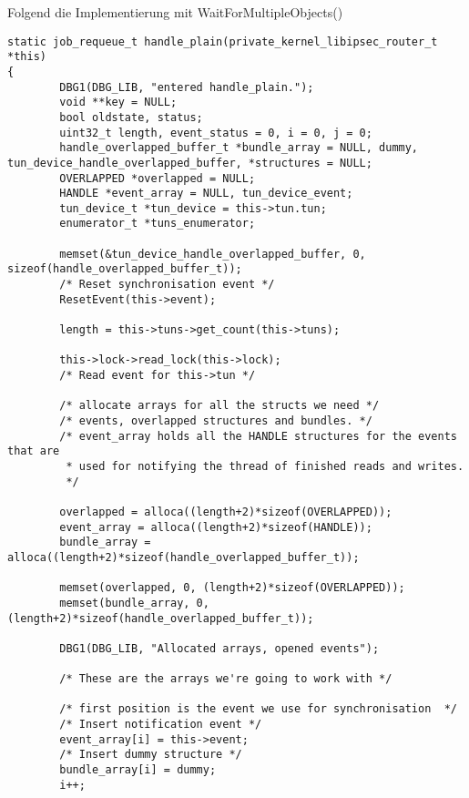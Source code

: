 Folgend die Implementierung mit WaitForMultipleObjects()
\begin{lstlisting}[caption=Code für handle\_plain auf Windows]
static job_requeue_t handle_plain(private_kernel_libipsec_router_t *this)
{
        DBG1(DBG_LIB, "entered handle_plain.");
        void **key = NULL;
        bool oldstate, status;
        uint32_t length, event_status = 0, i = 0, j = 0;
        handle_overlapped_buffer_t *bundle_array = NULL, dummy, tun_device_handle_overlapped_buffer, *structures = NULL;
        OVERLAPPED *overlapped = NULL;
        HANDLE *event_array = NULL, tun_device_event;
        tun_device_t *tun_device = this->tun.tun;
        enumerator_t *tuns_enumerator;

        memset(&tun_device_handle_overlapped_buffer, 0, sizeof(handle_overlapped_buffer_t));
        /* Reset synchronisation event */
        ResetEvent(this->event);

        length = this->tuns->get_count(this->tuns);

        this->lock->read_lock(this->lock);
        /* Read event for this->tun */

        /* allocate arrays for all the structs we need */
        /* events, overlapped structures and bundles. */
        /* event_array holds all the HANDLE structures for the events that are
         * used for notifying the thread of finished reads and writes.
         */

        overlapped = alloca((length+2)*sizeof(OVERLAPPED));
        event_array = alloca((length+2)*sizeof(HANDLE));
        bundle_array = alloca((length+2)*sizeof(handle_overlapped_buffer_t));

        memset(overlapped, 0, (length+2)*sizeof(OVERLAPPED));
        memset(bundle_array, 0, (length+2)*sizeof(handle_overlapped_buffer_t));

        DBG1(DBG_LIB, "Allocated arrays, opened events");

        /* These are the arrays we're going to work with */

        /* first position is the event we use for synchronisation  */
        /* Insert notification event */
        event_array[i] = this->event;
        /* Insert dummy structure */
        bundle_array[i] = dummy;
        i++;


\end{lstlisting}
